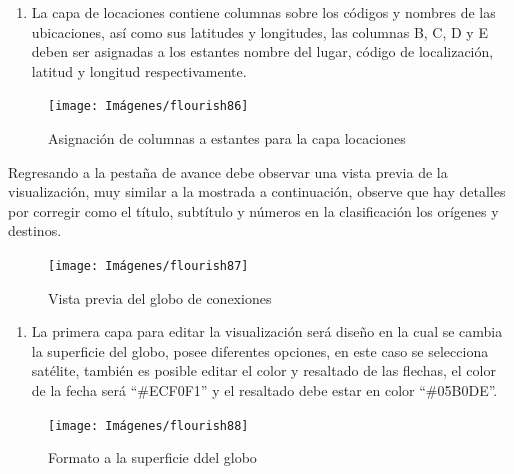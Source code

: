 \documentclass[
]{book}
\providecommand{\tightlist}{%
  \setlength{\itemsep}{0pt}\setlength{\parskip}{0pt}}
\begin{document}
\begin{enumerate}
\def\labelenumi{\arabic{enumi}.}
\setcounter{enumi}{2}
\tightlist
\item
  La capa de locaciones contiene columnas sobre los códigos y nombres de las ubicaciones, así como sus latitudes y longitudes, las columnas B, C, D y E deben ser asignadas a los estantes nombre del lugar, código de localización, latitud y longitud respectivamente.
\end{enumerate}

\begin{figure}

{\centering \texttt{[image: Imágenes/flourish86]} 

}

\caption{Asignación de columnas a estantes para la capa locaciones}\label{fig:paso3globoconexionesflourish-fig}
\end{figure}

Regresando a la pestaña de avance debe observar una vista previa de la visualización, muy similar a la mostrada a continuación, observe que hay detalles por corregir como el título, subtítulo y números en la clasificación los orígenes y destinos.

\begin{figure}

{\centering \texttt{[image: Imágenes/flourish87]} 

}

\caption{Vista previa del globo de conexiones}\label{fig:vistapreviagloboconexionesflourish-fig}
\end{figure}

\begin{enumerate}
\def\labelenumi{\arabic{enumi}.}
\setcounter{enumi}{3}
\tightlist
\item
  La primera capa para editar la visualización será diseño en la cual se cambia la superficie del globo, posee diferentes opciones, en este caso se selecciona satélite, también es posible editar el color y resaltado de las flechas, el color de la fecha será ``\#ECF0F1'' y el resaltado debe estar en color ``\#05B0DE''.
\end{enumerate}

\begin{figure}

{\centering \texttt{[image: Imágenes/flourish88]} 

}

\caption{Formato a la superficie ddel globo}\label{fig:paso4globoconexionesflourish-fig}
\end{figure}
\end{document}
